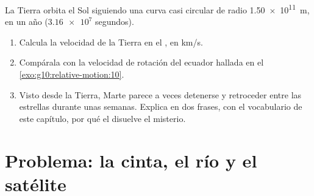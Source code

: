\begin{exercise}[$\star\star\star$]\label{exo:g10:relative-motion:15}
La Tierra orbita el Sol siguiendo una curva casi circular de radio
\qty{1.50e11}{m}, en un año ($\num{3.16e7}$ segundos).
\begin{enumerate}
  \item Calcula la velocidad de la Tierra en el ,
        en \unit{km/s}.
  \item Compárala con la velocidad de rotación del ecuador hallada en el
        \cref{exo:g10:relative-motion:10}.
  \item Visto desde la Tierra, Marte parece a veces detenerse y
        retroceder entre las estrellas durante unas semanas. Explica en
        dos frases, con el vocabulario de este capítulo, por qué el
         disuelve el misterio.
\end{enumerate}
\end{exercise}

\section{Problema: la cinta, el río y el satélite}


